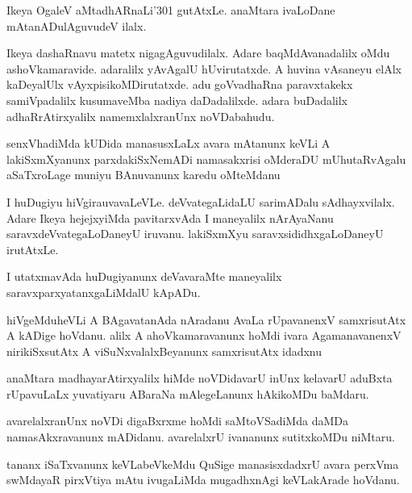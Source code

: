 \documentclass{article}
\begin{document}
\begin{mn}%
Ikeya OgaleV aMtadhARnaLi\char'301 gutAtxLe. anaMtara ivaLoDane mAtanADulAguvudeV ilalx.
\end{mn}

\begin{mn}%
Ikeya dashaRnavu matetx nigagAguvudilalx. Adare baqMdAvanadalilx oMdu ashoVkamaravide. 
adaralilx yAvAgalU hUvirutatxde. A huvina vAsaneyu elAlx kaDeyalUlx vAyxpisikoMDirutatxde. 
adu goVvadhaRna paravxtakekx samiVpadalilx kusumaveMba nadiya daDadalilxde. adara 
buDadalilx  adhaRrAtirxyalilx namemxlalxranUnx noVDabahudu.
\end{mn}

\begin{mn}%
senxVhadiMda kUDida manasusxLaLx avara mAtanunx keVLi A lakiSxmXyanunx parxdakiSxNemADi 
namasakxrisi oMderaDU mUhutaRvAgalu aSaTxroLage muniyu BAnuvanunx karedu oMteMdanu
\end{mn}

\begin{mn}%
I huDugiyu hiVgirauvavaLeVLe. deVvategaLidaLU sarimADalu sAdhayxvilalx. Adare Ikeya 
hejejxyiMda pavitarxvAda I maneyalilx nArAyaNanu saravxdeVvategaLoDaneyU iruvanu. 
lakiSxmXyu saravxsididhxgaLoDaneyU irutAtxLe.
\end{mn}

\begin{mn}%
I utatxmavAda huDugiyanunx deVavaraMte maneyalilx saravxparxyatanxgaLiMdalU kApADu.
\end{mn}

\begin{mn}%
hiVgeMduheVLi A BAgavatanAda nAradanu AvaLa rUpavanenxV samxrisutAtx A kADige hoVdanu. alilx 
A ahoVkamaravanunx hoMdi ivara AgamanavanenxV nirikiSxsutAtx A viSuNxvalalxBeyanunx 
samxrisutAtx idadxnu
\end{mn}

\begin{mn}%
anaMtara madhayarAtirxyalilx hiMde noVDidavarU inUnx kelavarU aduBxta rUpavuLaLx 
yuvatiyaru ABaraNa mAlegeLanunx hAkikoMDu baMdaru.
\end{mn}

\begin{mn}%
avarelalxranUnx noVDi digaBxrxme hoMdi saMtoVSadiMda daMDa namasAkxravanunx mADidanu. 
avarelalxrU ivananunx sutitxkoMDu niMtaru.
\end{mn}

\begin{mn}%
tananx iSaTxvanunx keVLabeVkeMdu QuSige manasisxdadxrU avara perxVma swMdayaR pirxVtiya 
mAtu ivugaLiMda mugadhxnAgi keVLakArade hoVdanu.
\end{mn}
\end{document}

